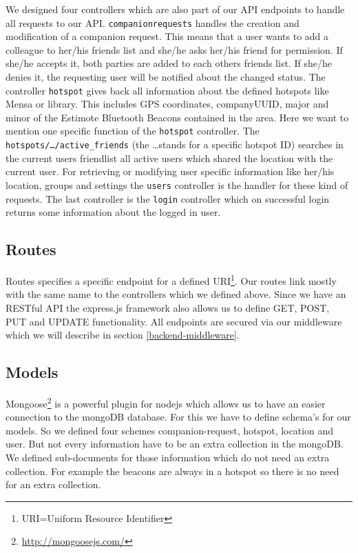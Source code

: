 We designed four controllers which are also part of our API endpoints to handle all requests to our API. \texttt{companionrequests} handles the creation and modification of a companion request. This means that a user wants to add a colleague to her/his friends list and she/he asks her/his friend for permission. If she/he accepts it, both parties are added to each others friends list. If she/he denies it, the requesting user will be notified about the changed status. The controller \texttt{hotspot} gives back all information about the defined hotspots like Mensa or library. This includes GPS coordinates, companyUUID, major and minor of the Estimote Bluetooth Beacons contained in the area. Here we want to mention one specific function of the \texttt{hotspot} controller. The \texttt{hotspots/\ldots/active\_friends} (the \ldots stands for a specific hotspot ID) searches in the current users friendlist all active users which shared the location with the current user. For retrieving or modifying user specific information like her/his location, groups and settings the \texttt{users} controller is the handler for these kind of requests. The last controller is the \texttt{login} controller which on successful login returns some information about the logged in user.

\subsection{Routes}

Routes specifies a specific endpoint for a defined URI\footnote{URI=Uniform Resource Identifier}. Our routes link mostly with the same name to the controllers which we defined above. Since we have an RESTful API the express.js framework also allows us to define GET, POST, PUT and UPDATE functionality. All endpoints are secured via our middleware which we will describe in section \ref{backend-middleware}.

\subsection{Models}
\label{mongodb-models}

Mongoose\footnote{\url{http://mongoosejs.com/}} is a powerful plugin for nodejs which allows us to have an easier connection to the mongoDB database. For this we have to define schema's for our models. So we defined four schemes companion-request, hotspot, location and user. But not every information have to be an extra collection in the mongoDB. We defined sub-documents for those information which do not need an extra collection. For example the beacons are always in a hotspot so there is no need for an extra collection.


